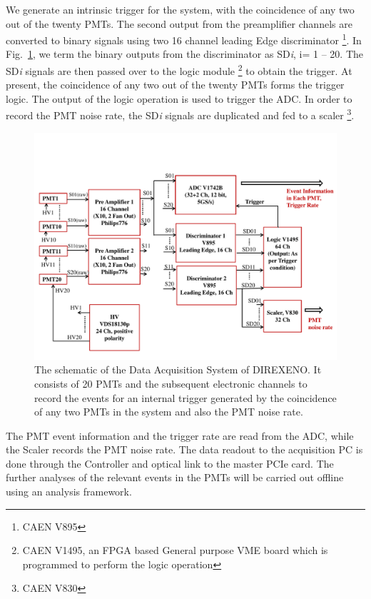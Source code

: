 We generate an intrinsic trigger for the system, 
with the coincidence of any two out of the twenty PMTs. The second output from the 
preamplifier channels are converted to binary signals using two 16 channel leading 
Edge discriminator \footnote{CAEN V895}. In Fig.~\ref{Fig:DAQscheme}, we term the binary 
outputs from the discriminator as SD{\it i}, i= 1 -- 20. The SD{\it i} signals are then passed over to 
the logic module \footnote{CAEN V1495, an FPGA based General purpose VME board which is programmed to perform the 
logic operation} to obtain the trigger. At present, the coincidence of any two out 
of the twenty PMTs forms the trigger logic. The output of the logic operation is 
used to trigger the ADC. In order to record the PMT noise rate, the 
SD{\it i} signals are duplicated and fed to a scaler \footnote{CAEN V830}.


\begin{figure}
   \centering
   \includegraphics[width=\textwidth]{DAQscheme.pdf}
   \caption{The schematic of the Data Acquisition System of DIREXENO. It 
        consists of 20 PMTs and the subsequent electronic channels to record 
        the events for an internal trigger generated by the coincidence of any 
        two PMTs in the system and also the PMT noise rate.}
   \label{Fig:DAQscheme}
\end{figure}

The PMT event information and the trigger rate are read from the ADC, while the Scaler 
records the PMT noise rate. The data readout to the acquisition PC is done through the 
Controller and optical link to the master PCIe card. The further analyses of the 
relevant events in the PMTs will be carried out offline using an analysis 
framework.





\clearpage %